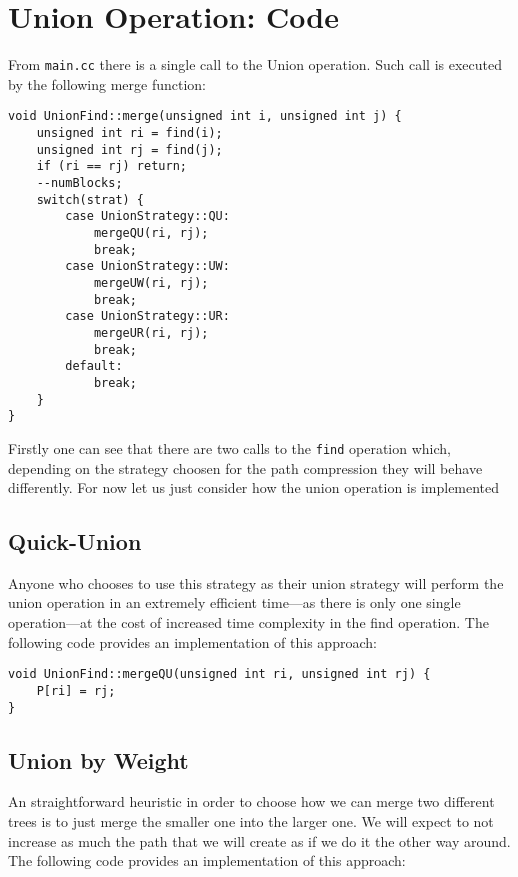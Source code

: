 \appendix
\section{Union Operation: Code}
From \texttt{main.cc} there is a single call to the Union operation. Such call is executed by the following merge function:

\begin{center}
    \begin{verbatim}
void UnionFind::merge(unsigned int i, unsigned int j) {
    unsigned int ri = find(i);
    unsigned int rj = find(j);
    if (ri == rj) return;
    --numBlocks;
    switch(strat) {
        case UnionStrategy::QU:
            mergeQU(ri, rj);
            break;
        case UnionStrategy::UW:
            mergeUW(ri, rj);
            break;
        case UnionStrategy::UR:
            mergeUR(ri, rj);
            break;
        default:
            break;
    }
}
    \end{verbatim}
\end{center}

Firstly one can see that there are two calls to the \texttt{find} operation which, depending on the strategy choosen for the path compression they will behave differently. For now let us just consider how the union operation is implemented 

\subsection{Quick-Union}
Anyone who chooses to use this strategy as their union strategy will perform the union operation in an extremely efficient time—as there is only one single operation—at the cost of increased time complexity in the find operation. The following code provides an implementation of this approach:

\begin{center}
    \begin{verbatim}
void UnionFind::mergeQU(unsigned int ri, unsigned int rj) {
    P[ri] = rj;
}
    \end{verbatim}
\end{center}

\subsection{Union by Weight}
An straightforward heuristic in order to choose how we can merge two different trees is to just merge the smaller one into the larger one. We will expect to not increase as much the path that we will create as if we do it the other way around. The following code provides an implementation of this approach:

